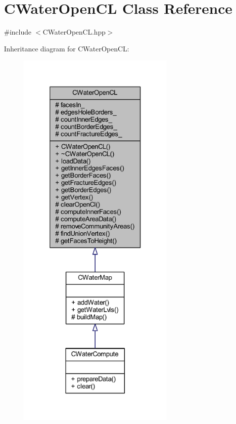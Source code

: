 \hypertarget{class_c_water_open_c_l}{}\section{C\+Water\+Open\+CL Class Reference}
\label{class_c_water_open_c_l}


{\ttfamily \#include $<$C\+Water\+Open\+C\+L.\+hpp$>$}



Inheritance diagram for C\+Water\+Open\+CL\+:
\nopagebreak
\begin{figure}[H]
\begin{center}
\leavevmode
\includegraphics[width=217pt]{class_c_water_open_c_l__inherit__graph}
\end{center}
\end{figure}


